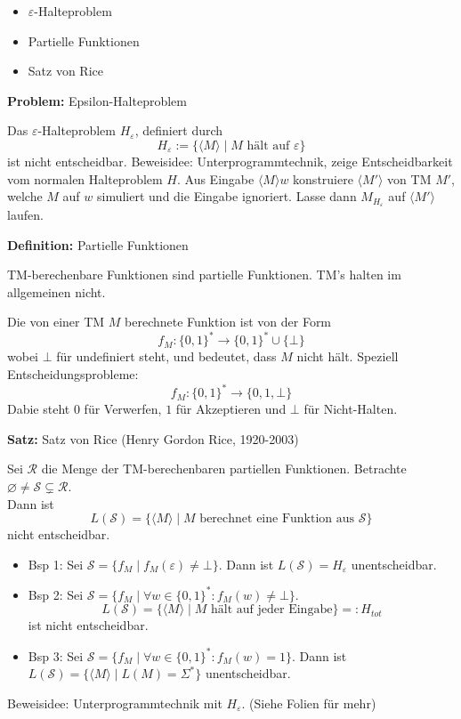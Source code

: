 \documentclass[a4paper,graphics,11pt]{article}
\newcommand{\eps}[0]{\varepsilon}
\newcommand{\godel}[1]{\langle #1 \rangle}
\begin{document}
\begin{itemize}
    \item $\eps$-Halteproblem
    \item Partielle Funktionen
    \item Satz von Rice
\end{itemize}


\textbf{Problem:} Epsilon-Halteproblem

Das $\eps$-Halteproblem $H_\eps$, definiert durch
$$
    H_\eps := \{\langle M \rangle \mid M \text{ hält auf } \eps\}
$$
ist nicht entscheidbar. Beweisidee: Unterprogrammtechnik, zeige Entscheidbarkeit vom normalen Halteproblem $H$.
Aus Eingabe $\langle M \rangle w$ konstruiere $\langle M'\rangle$ von TM $M'$, welche $M$ auf $w$ simuliert
und die Eingabe ignoriert. Lasse dann $M_{H_\eps}$ auf $\langle M'\rangle$ laufen.

\strut

\textbf{Definition:} Partielle Funktionen

TM-berechenbare Funktionen sind partielle Funktionen. TM's halten im allgemeinen nicht.

Die von einer TM $M$ berechnete Funktion ist von der Form
$$
    f_M : \{0,1\}^* \to \{0,1\}^* \cup \{\bot\}
$$
wobei $\bot$ für undefiniert steht, und bedeutet, dass $M$ nicht hält. Speziell Entscheidungsprobleme:
$$
    f_M : \{0,1\}^* \to \{0,1,\bot\}
$$
Dabie steht $0$ für Verwerfen, $1$ für Akzeptieren und $\bot$ für Nicht-Halten.

\newpage

\textbf{Satz:} Satz von Rice (Henry Gordon Rice, 1920-2003)

Sei $\mathcal{R}$ die Menge der TM-berechenbaren partiellen Funktionen.
Betrachte $\varnothing \neq \mathcal{S} \subsetneq \mathcal{R}$.\\
Dann ist
$$
    L(\mathcal{S}) = \{\langle M \rangle \mid M \text{ berechnet eine Funktion aus } \mathcal{S}\}
$$
nicht entscheidbar.
\begin{itemize}
    \item Bsp 1: Sei $\mathcal{S} = \{f_M \mid f_M(\eps) \neq \bot\}$.
        Dann ist $L(\mathcal{S}) = H_\eps$ unentscheidbar.
    \item Bsp 2: Sei $\mathcal{S} = \{f_M \mid \forall w \in \{0,1\}^*: f_M(w) \neq \bot\}$.
        $$
            L(\mathcal{S}) = \{\godel{M} \mid M \text{ hält auf jeder Eingabe}\} =: H_{tot}
        $$
        ist nicht entscheidbar.
    \item Bsp 3: Sei $\mathcal{S} = \{f_M \mid \forall w \in \{0,1\}^*: f_M(w) = 1\}$. Dann ist
        $
            L(\mathcal{S}) = \{\godel{M} \mid L(M) = \Sigma^*\}
        $
        unentscheidbar.
\end{itemize}
Beweisidee:
Unterprogrammtechnik mit $H_\eps$. (Siehe Folien für mehr)
\end{document}
